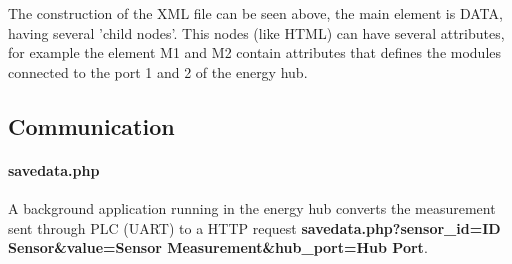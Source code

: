 The construction of the XML file can be seen above, the main element is DATA, having several 'child nodes'. This nodes (like HTML) can have several attributes, for example the element M1 and M2 contain attributes that defines the modules connected to the port 1 and 2 of the energy hub.

\subsection{Communication}
\paragraph{savedata.php}

A background application running in the energy hub converts the measurement sent through PLC (UART) to a HTTP request \textbf{savedata.php?sensor\_id=ID Sensor\&value=Sensor Measurement\&hub\_port=Hub Port}.

